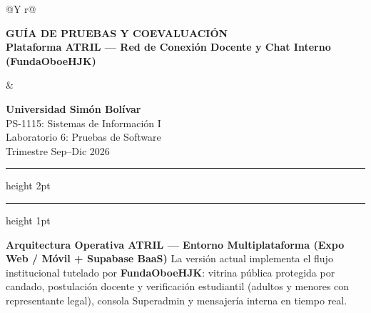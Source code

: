 \documentclass[10pt,letterpaper]{article}
\begin{document}
\color{atrilTextBody}


\noindent
\begin{tabularx}{\textwidth}{@{}Y r@{}}
  \begin{minipage}[t]{\linewidth}
    {\LARGE\bfseries\color{atrilNavy} GUÍA DE PRUEBAS Y COEVALUACIÓN}\\[3pt]
    {\normalsize\bfseries\color{atrilPrimary} Plataforma ATRIL --- Red de Conexión Docente y Chat Interno (FundaOboeHJK)}
  \end{minipage}
  &
  \begin{minipage}[t]{0.36\textwidth}\raggedleft\footnotesize\color{atrilTextMuted}
    \textbf{\color{atrilNavy}Universidad Simón Bolívar}\\
    PS-1115: Sistemas de Información I\\
    Laboratorio 6: Pruebas de Software\\
    Trimestre Sep--Dic 2026
  \end{minipage}
\end{tabularx}

\vspace{0.14cm}
{\color{atrilPrimary}\hrule height 2pt}
{\color{atrilGold}\hrule height 1pt}
\vspace{0.18cm}

\begin{tcolorbox}[
  colback=atrilBg,
  colframe=atrilPrimary,
  boxrule=0.9pt,
  arc=4pt,
  left=8pt,
  right=8pt,
  top=5pt,
  bottom=5pt
]
  \textbf{\small\color{atrilNavy} Arquitectura Operativa ATRIL --- Entorno Multiplataforma (Expo Web / Móvil + Supabase BaaS)}
  {\footnotesize\color{atrilTextBody}
  La versión actual implementa el flujo institucional tutelado por \textbf{FundaOboeHJK}: vitrina pública protegida por candado, postulación docente y verificación estudiantil (adultos y menores con representante legal), consola Superadmin y mensajería interna en tiempo real.}
\end{tcolorbox}

\vspace{0.10cm}
\end{document}
